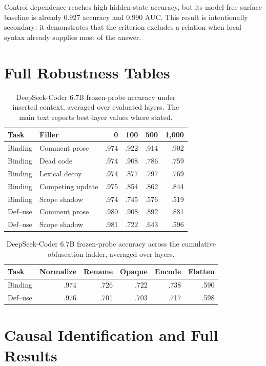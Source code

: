 \documentclass{article}
\begin{document}
Control dependence reaches high hidden-state accuracy, but its model-free surface baseline is already $0.927$ accuracy and $0.990$ AUC. This result is intentionally secondary: it demonstrates that the criterion excludes a relation when local syntax already supplies most of the answer.

\section{Full Robustness Tables}

\begin{table}[h]
\centering
\small
\caption{DeepSeek-Coder 6.7B frozen-probe accuracy under inserted context, averaged over evaluated layers. The main text reports best-layer values where stated.}
\begin{tabular}{llrrrr}
\toprule
Task & Filler & 0 & 100 & 500 & 1,000 \\
\midrule
Binding & Comment prose & .974 & .922 & .914 & .902 \\
Binding & Dead code & .974 & .908 & .786 & .759 \\
Binding & Lexical decoy & .974 & .877 & .797 & .769 \\
Binding & Competing update & .975 & .854 & .862 & .844 \\
Binding & Scope shadow & .974 & .745 & .576 & .519 \\
Def--use & Comment prose & .980 & .908 & .892 & .881 \\
Def--use & Scope shadow & .981 & .722 & .643 & .596 \\
\bottomrule
\end{tabular}
\end{table}

\begin{table}[h]
\centering
\small
\caption{DeepSeek-Coder 6.7B frozen-probe accuracy across the cumulative obfuscation ladder, averaged over layers.}
\begin{tabular}{lrrrrr}
\toprule
Task & Normalize & Rename & Opaque & Encode & Flatten \\
\midrule
Binding & .974 & .726 & .722 & .738 & .590 \\
Def--use & .976 & .701 & .703 & .717 & .598 \\
\bottomrule
\end{tabular}
\end{table}

\section{Causal Identification and Full Results}
\end{document}

